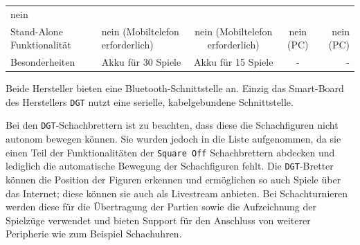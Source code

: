 \begin{longtable}[]{@{}llccr@{}}
\begin{minipage}[t]{0.13\columnwidth}
nein\strut
\end{minipage}\tabularnewline
\begin{minipage}[t]{0.19\columnwidth}\raggedright
Stand-Alone Funktionalität\strut
\end{minipage} & \begin{minipage}[t]{0.19\columnwidth}\raggedright
nein (Mobiltelefon erforderlich)\strut
\end{minipage} & \begin{minipage}[t]{0.20\columnwidth}\centering
nein (Mobiltelefon erforderlich)\strut
\end{minipage} & \begin{minipage}[t]{0.15\columnwidth}\centering
nein (PC)\strut
\end{minipage} & \begin{minipage}[t]{0.13\columnwidth}\raggedleft
nein (PC)\strut
\end{minipage}\tabularnewline
\begin{minipage}[t]{0.19\columnwidth}\raggedright
Besonderheiten\strut
\end{minipage} & \begin{minipage}[t]{0.19\columnwidth}\raggedright
Akku für 30 Spiele\strut
\end{minipage} & \begin{minipage}[t]{0.20\columnwidth}\centering
Akku für 15 Spiele\strut
\end{minipage} & \begin{minipage}[t]{0.15\columnwidth}\centering
-\strut
\end{minipage} & \begin{minipage}[t]{0.13\columnwidth}\raggedleft
-\strut
\end{minipage}\tabularnewline
\bottomrule
\end{longtable}

\pagebreak

Beide Hersteller bieten eine Bluetooth-Schnittstelle an. Einzig das
Smart-Board des Herstellers \passthrough{\lstinline!DGT!} nutzt eine
serielle, kabelgebundene Schnittstelle.

Bei den \passthrough{\lstinline!DGT!}-Schachbrettern ist zu beachten,
dass diese die Schachfiguren nicht autonom bewegen können. Sie wurden
jedoch in die Liste aufgenommen, da sie einen Teil der Funktionalitäten
der \passthrough{\lstinline!Square Off!} Schachbrettern abdecken und
lediglich die automatische Bewegung der Schachfiguren fehlt. Die
\passthrough{\lstinline!DGT!}-Bretter können die Position der Figuren
erkennen und ermöglichen so auch Spiele über das Internet; diese können
sie auch als Livestream anbieten. Bei Schachturnieren werden diese für
die Übertragung der Partien sowie die Aufzeichnung der Spielzüge
verwendet und bieten Support für den Anschluss von weiterer Peripherie
wie zum Beispiel Schachuhren.

